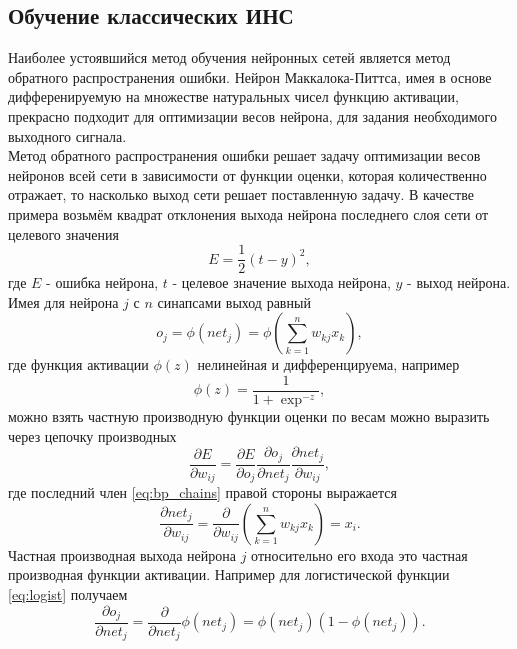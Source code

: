 \documentclass[a4paper,10pt]{article}
\begin{document}
\subsection{Обучение классических ИНС}
\indent Наиболее устоявшийся метод обучения нейронных сетей является метод обратного распространения ошибки. Нейрон Маккалока-Питтса, имея в основе дифференируемую на множестве натуральных чисел функцию активации, прекрасно подходит для оптимизации весов нейрона, для задания необходимого выходного сигнала.\\  
\indent Метод обратного распространения ошибки решает задачу оптимизации весов нейронов всей сети в зависимости от функции оценки, которая количественно отражает, то насколько выход сети решает поставленную задачу. В качестве примера возьмём квадрат отклонения выхода нейрона последнего слоя сети от целевого значения
\begin{equation}
E = \frac{1}{2}(t-y)^2,
\end{equation} 
где $E$ - ошибка нейрона, $t$ - целевое значение выхода нейрона, $y$ - выход нейрона.\\
\indent Имея для нейрона $j$ с $n$ синапсами выход равный
\begin{equation}
o_{j}=\phi (net_{j}) = \phi \left(\sum_{k=1}^{n}w_{kj}x_{k}\right),
\end{equation}
где функция активации $\phi(z)$ нелинейная и дифференцируема, например
\begin{equation}\label{eq:logist}
\phi(z)=\frac{1}{1+\exp^{-z}},
\end{equation}
можно взять частную производную функции оценки по весам можно выразить через цепочку производных
\begin{equation}\label{eq:bp_chains}
\frac{\partial E}{\partial w_{ij}} = \frac{\partial E}{\partial o_{j}} \frac{{\partial o_{j}}}{\partial net_{j}} \frac{{\partial net_{j}}}{\partial w_{ij}},
\end{equation}
где последний член \eqref{eq:bp_chains} правой стороны выражается
\begin{equation}
\frac{{\partial net_{j}}}{\partial w_{ij}} = \frac{\partial}{\partial w_{ij}} \left(\sum_{k=1}^{n}w_{kj}x_{k}\right) = x_{i}.
\end{equation}
\indent Частная производная выхода нейрона $j$ относительно его входа это частная производная функции активации. Например для логистической функции \eqref{eq:logist} получаем
\begin{equation}
\frac{{\partial o_{j}}}{\partial net_{j}} = \frac{\partial}{\partial net_{j}} \phi(net_{j}) = \phi(net_{j})(1-\phi(net_{j})).
\end{equation}
\end{document}
